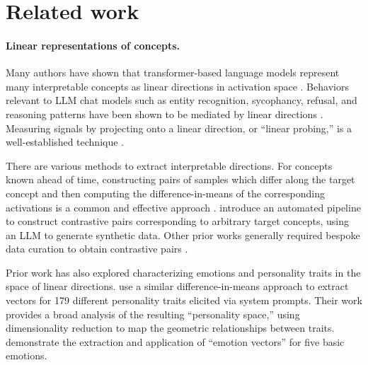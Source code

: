 \section{Related work}

\paragraph{Linear representations of concepts.}
Many authors have shown that transformer-based language models represent many interpretable concepts as linear directions in activation space \citep{turner2024steeringlanguagemodelsactivation, zou2025representationengineeringtopdownapproach,templeton2024scaling}.
Behaviors relevant to LLM chat models such as entity recognition, sycophancy, refusal, and reasoning patterns have been shown to be mediated by linear directions \citep{ferrando2025iknowentityknowledge, panickssery2024steeringllama2contrastive, arditi2024refusallanguagemodelsmediated, chen2025seal}.
Measuring signals by projecting onto a linear direction, or ``linear probing,'' is a well-established technique \citep{alain2018understandingintermediatelayersusing, belinkov2021probingclassifierspromisesshortcomings}.

There are various methods to extract interpretable directions.
For concepts known ahead of time, constructing pairs of samples which differ along the target concept and then computing the difference-in-means of the corresponding activations is a common and effective approach \citep{marks2024geometrytruthemergentlinear, belrose2023diff}.
\citet{wu2025axbenchsteeringllmssimple} introduce an automated pipeline to construct contrastive pairs corresponding to arbitrary target concepts, using an LLM to generate synthetic data.
Other prior works generally required bespoke data curation to obtain contrastive pairs
\citep{turner2024steeringlanguagemodelsactivation, panickssery2024steeringllama2contrastive, zou2025representationengineeringtopdownapproach}.

Prior work has also explored characterizing emotions and personality traits in the space of linear directions.
\citet{allbert2024identifying} use a similar difference-in-means approach to extract vectors for 179 different personality traits elicited via system prompts. Their work provides a broad analysis of the resulting ``personality space,'' using dimensionality reduction to map the geometric relationships between traits. 
\citet{dong2025controllable} demonstrate the extraction and application of ``emotion vectors'' for five basic emotions.

